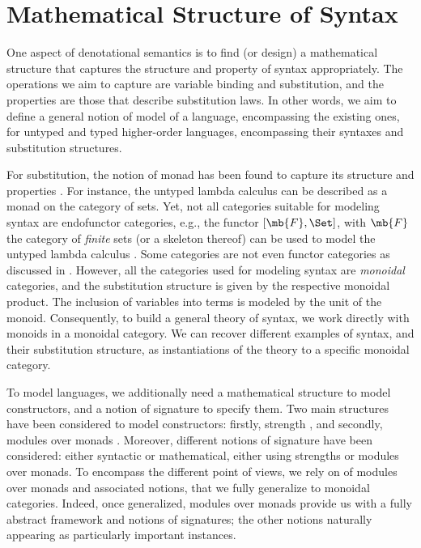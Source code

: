 \section{Mathematical Structure of Syntax}
\label{sec:models}

One aspect of denotational semantics is to find (or design) a mathematical structure
that captures the structure and property of syntax appropriately.
The operations we aim to capture are variable binding and substitution, and the properties
are those that describe substitution laws.
In other words, we aim to define a general notion of model of a language, encompassing the existing ones, for
untyped and typed higher-order languages, encompassing their syntaxes and
substitution structures.

%
For substitution, the notion of monad has been found to capture its structure and properties
\cite{BellegardeHook94,DeBruijnasNestedDatatype99,AltenkirchReus99}.
For instance, the untyped lambda calculus can be described as a monad on the category of sets.
%
Yet, not all categories suitable for modeling syntax are endofunctor categories,
e.g., the functor $[\mb{F},\Set]$, with $\mb{F}$ the category of \emph{finite} sets (or a skeleton thereof) can be used to model the untyped lambda calculus \cite{FPT99}.
Some categories are not even functor categories as discussed in \cite{ISPoly24}.
%
However, all the categories used for modeling syntax are \emph{monoidal} categories, and the
substitution structure is given by the respective monoidal product.
The inclusion of variables into terms is modeled by the unit of the monoid.
%
Consequently, to build a general theory of syntax, we work directly with
monoids in a monoidal category.
We can recover different examples of syntax, and their substitution structure,
as instantiations of the theory to a specific monoidal category.



To model languages, we additionally need a mathematical structure to model
constructors, and a notion of signature to specify them.
%
Two main structures have been considered to model constructors: firstly,
strength \cite{FPT99,Cbn02,ListObjects17}, and secondly, modules over monads
\cite{HirschowitzMaggesi10,ZsidoPhd10,PresentableSignatures21}.
%
Moreover, different notions of signature have been considered: either
syntactic or mathematical, either using strengths or modules over monads.
%
To encompass the different point of views, we rely on of modules over monads and
associated notions, that we fully generalize to monoidal categories.
%
Indeed, once generalized, modules over monads provide us with a fully abstract
framework and notions of signatures; the other notions naturally appearing
as particularly important instances.

